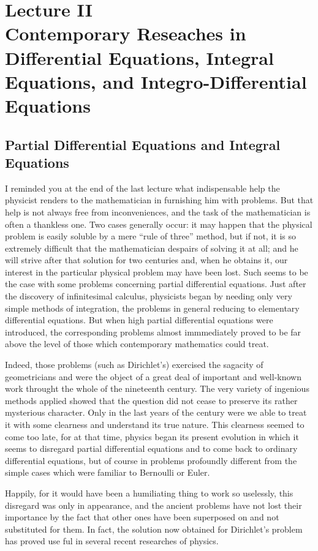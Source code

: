 \documentclass[12pt,oneside]{book}
\begin{document}
\chapter{Lecture II\\Contemporary Reseaches in Differential Equations, Integral Equations, and Integro-Differential Equations}
\section{Partial Differential Equations and Integral Equations}
I reminded you at the end of the last lecture what indispensable help the physicist renders to the mathematician in furnishing him with problems. But that help is not always free from inconveniences, and the task of the mathematician is often a thankless one. Two cases generally occur: it may happen that the physical problem is easily soluble by a mere ``rule of three'' method, but if not, it is so extremely difficult that the mathematician despairs of solving it at all; and he will strive after that solution for two centuries and, when he obtains it, our interest in the particular physical problem may have been lost. Such seems to be the case with some problems concerning partial differential equations. Just after the discovery of infinitesimal calculus, physicists began by needing only very simple methods of integration, the problems in general reducing to elementary differential equations. But when high partial differential equations were introduced, the corresponding problems almost immmediately proved to be far above the level of those which contemporary mathematics could treat. \par 

Indeed, those problems (such as Dirichlet's) exercised the sagacity of geometricians and were the object of a great deal of important and well-known work throught the whole of the nineteenth century. The very variety of ingenious methods applied showed that the question did not cease to preserve its rather mysterious character. Only in the last years of the century were we able to treat it with some clearness and understand its true nature. This clearness seemed to come too late, for at that time, physics began its present evolution in which it seems to disregard partial differential equations and to come back to ordinary differential equations, but of course in problems profoundly different from the simple cases which were familiar to Bernoulli or Euler. \par 

Happily, for it would have been a humiliating thing to work so uselessly, this disregard was only in appearance, and the ancient problems have not lost their importance by the fact that other ones have been superposed on and not substituted for them. In fact, the solution now obtained for Dirichlet's problem has proved use ful in several recent researches of physics. \par 
\end{document}
